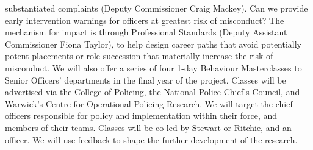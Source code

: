 \documentclass[11pt, a4paper]{article}
\begin{document}
substantiated complaints (Deputy Commissioner Craig Mackey). Can we provide early
intervention warnings for officers at greatest risk of misconduct? The mechanism for impact
is through Professional Standards (Deputy Assistant Commissioner Fiona Taylor), to help
design career paths that avoid potentially potent placements or role succession that
materially increase the risk of misconduct.
We will also offer a series of four 1-day Behaviour Masterclasses to Senior Officers'
departments in the final year of the project. Classes will be advertised via the College of
Policing, the National Police Chief’s Council, and Warwick’s Centre for Operational Policing
Research. We will target the chief officers responsible for policy and implementation within
their force, and members of their teams. Classes will be co-led by Stewart or Ritchie, and an
officer. We will use feedback to shape the further development of the research.
\newpage



\end{document}
